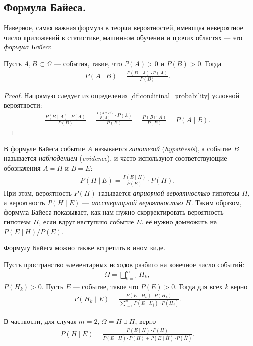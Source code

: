 \documentclass[../main.tex]{subfiles}
\begin{document}
\subsection{Формула Байеса.}

Наверное, самая важная формула в теории вероятностей, имеющая невероятное число приложений в статистике, машинном обучении и прочих областях --- это \textit{формула Байеса}.

\begin{prop}
 Пусть $ A, B \subset \Omega $ --- события, такие, что $P(A) > 0$ и  $P(B) > 0$. Тогда
 \begin{align}
  \label{equation:bayes_formula}
  P(A \mid B) = \frac{P(B \mid A) \cdot P(A)}{P(B)}.
 \end{align} 
\end{prop}
\begin{proof} Напрямую следует из определения \ref{df:conditinal_probability} условной вероятности:
 \begin{align*}
  \frac{P(B \mid A) \cdot P(A)}{P(B)} = \frac{\frac{P(A \cap B)}{P(A)} \cdot P(A)}{P(B)} = \frac{P(B \cap A)}{P(B)} = P(A \mid B).
 \end{align*}
\end{proof}

В формуле Байеса событие $ A $ называется \textit{гипотезой} (\textit{hypothesis}), а событие $ B $ называется \textit{наблюдением} (\textit{evidence}), и часто используют соответствующие обозначения $ A = H $ и  $ B = E $:
\begin{align*}
 P(H \mid E) = \frac{P(E \mid H)}{P(E)} \cdot P(H).
\end{align*} При этом, вероятность $ P(H) $ называется  \textit{априорной вероятностью} гипотезы $ H $, а вероятность $ P(H\mid E) $ ---  \textit{апостериорной вероятностью} $ H $. Таким образом, формула Байеса показывает, как нам нужно скорректировать вероятность гипотезы $ H $, если вдруг наступило событие $ E $: её нужно домножить на $ P(E\mid H)/P(E) $.

Формулу Байеса можно также встретить в ином виде.

\begin{thm}[Байеса]
 Пусть пространство элементарных исходов разбито на конечное число событий:
 \begin{align*}
  \Omega = \bigsqcup_{k=1}^{m} H_k,
 \end{align*} $ P(H_k) > 0 $. Пусть $ E $  --- событие, такое что $ P(E)>0 $. Тогда для всех $ k $ верно
 \begin{align*}
  P(H_k \mid E) = \frac{P(E \mid H_k) \cdot P(H_k)}{ \sum_{j=1}^{m} P(E \mid H_j) \cdot P(H_j)}.
 \end{align*}

 В частности, для случая $ m=2 $,  $ \Omega = H \sqcup \overline H $, верно
 \begin{align*}
  P(H \mid E) = \frac{P(E \mid H) \cdot P(H)}{P(E \mid H) \cdot P(H) + P(E \mid \overline H) \cdot P(\overline H)}.
 \end{align*}
\end{thm}
\end{document}
